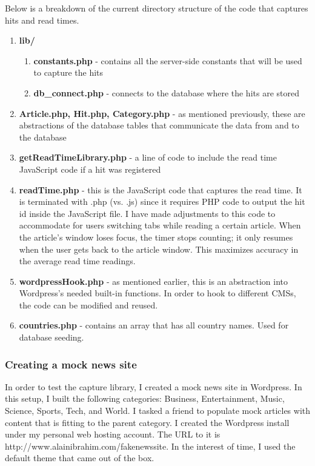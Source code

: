 \documentclass[12pt]{article}
\begin{document}
{\noindent Below is a breakdown of the current directory structure of the code that captures hits and read times.
\begin{enumerate}
\item \textbf{lib/}
\begin{enumerate}
\item \textbf{constants.php} - contains all the server-side constants that will be used to capture the hits
\item \textbf{db\_connect.php} - connects to the database where the hits are stored
\end{enumerate}
\item \textbf{Article.php, Hit.php, Category.php} - as mentioned previously, these are abstractions of the database tables that communicate the data from and to the database
\item \textbf{getReadTimeLibrary.php} - a line of code to include the read time JavaScript code if a hit was registered
\item \textbf{readTime.php} - this is the JavaScript code that captures the read time. It is terminated with .php (vs. .js) since it requires PHP code to output the hit id inside the JavaScript file. I have made adjustments to this code to accommodate for users switching tabs while reading a certain article. When the article's window loses focus, the timer stops counting; it only resumes when the user gets back to the article window. This maximizes accuracy in the average read time readings.
\item \textbf{wordpressHook.php} - as mentioned earlier, this is an abstraction into Wordpress's needed built-in functions. In order to hook to different CMSs, the code can be modified and reused. 
\item \textbf{countries.php} - contains an array that has all country names. Used for database seeding.
\end{enumerate}

\newpage

\subsubsection{Creating a mock news site} 
In order to test the capture library, I created a mock news site in Wordpress. In this setup, I built the following categories: Business, Entertainment, Music, Science, Sports, Tech, and World. I tasked a friend to populate mock articles with content that is fitting to the parent category. I created the Wordpress install under my personal web hosting account. The URL to it is http://www.alainibrahim.com/fakenewssite. In the interest of time, I used the default theme that came out of the box. \\

}
\end{document}
